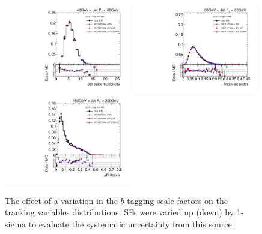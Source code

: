 \begin{figure}[tp]
\centering
\includegraphics[width=0.49\textwidth]{FIGS/systematics/BTagCalib_DataVarNtrkPT040.pdf}
\includegraphics[width=0.49\textwidth]{FIGS/systematics/BTagCalib_DataVarTrkWidthPT060.pdf}
\includegraphics[width=0.49\textwidth]{FIGS/systematics/BTagCalib_DataVarDRktaxisPT150.pdf}
\caption{The effect of a variation in the $b$-tagging scale factors on the tracking variables distributions. SFs were varied up (down) by 1-sigma to evaluate the systematic uncertainty from this source.}
\label{fig:btaggingSFs}
\end{figure}



